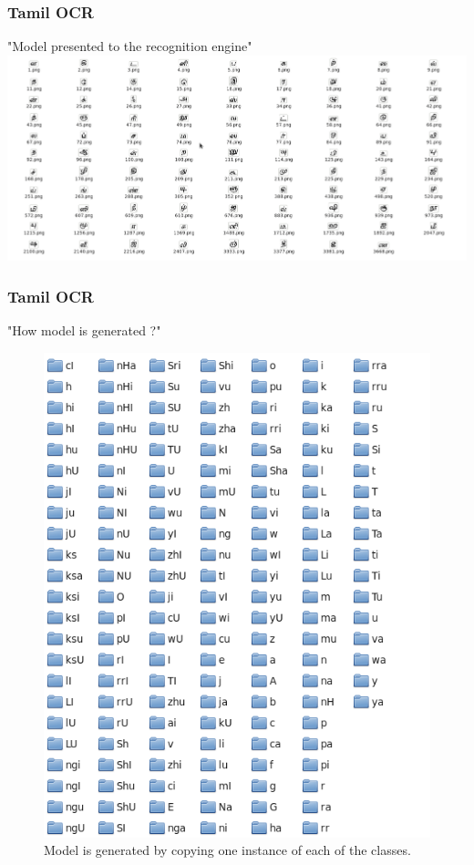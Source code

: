 \documentclass{beamer}
\begin{document}
\begin{frame}
  \frametitle{Tamil OCR}
  "Model presented to the recognition engine"
\includegraphics[scale=0.2]{./img/model} 
\end{frame}

\begin{frame}
  \frametitle{Tamil OCR}
  "How model is generated ?"
  \begin{figure}\centering
\includegraphics[scale=0.2]{./img/model_gen} 
  \caption{Model is generated by copying one instance of each of the classes.}
\end{figure}
\end{frame}
\end{document}
